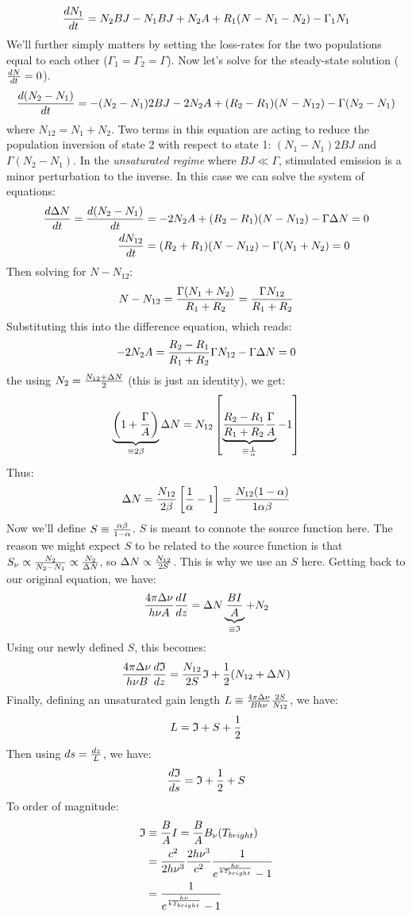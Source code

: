\documentclass[11pt]{article}
\def\hf{{1 \over 2}}
\def\inv#1{{1 \over #1}}
\begin{document}
$${dN_1\over dt}=N_2BJ-N_1BJ+N_2A+R_1(N-N_1-N_2)-\Gamma_1N_1$$
We'll further simply matters by setting the loss-rates for the two populations
equal to each other ($\Gamma_1=\Gamma_2=\Gamma$).  Now let's solve for the 
steady-state solution (${dN\over dt}=0$).
$${d(N_2-N_1)\over dt}=-(N_2-N_1)2BJ-2N_2A+(R_2-R_1)(N-N_{12})-\Gamma(N_2-N_1)$$
where $N_{12}=N_1+N_2$.
Two terms in this equation are acting to reduce the population inversion of
state 2 with respect to state 1: $(N_1-N_1)2BJ$ and $\Gamma(N_2-N_1)$.  In the
{\it unsaturated regime} where $BJ\ll\Gamma$, stimulated emission is a minor
perturbation to the inverse.  In this case we can solve the system of equations:
$$\begin{aligned}{d\Delta N\over dt}={d(N_2-N_1)\over dt}&=-2N_2A+(R_2-R_1)(N-N_{12})
-\Gamma\Delta N=0\\ 
{dN_{12}\over dt}&=(R_2+R_1)(N-N_{12})-\Gamma(N_1+N_2)=0\\ \end{aligned}$$
Then solving for $N-N_{12}$:
$$N-N_{12}={\Gamma(N_1+N_2)\over R_1+R_2}={\Gamma N_{12}\over R_1+R_2}$$
Substituting this into the difference equation, which reads:
$$-2N_2A={R_2-R_1\over R_1+R_2}\Gamma N_{12}-\Gamma\Delta N=0$$
the using $N_2={N_{12}+\Delta N\over2}$ (this is just an identity), we get:
$$\underbrace{\left(1+{\Gamma\over A}\right)}_{\equiv2\beta}\Delta N
=N_{12}\left[\underbrace{{R_2-R_1\over R_1+R_2}{\Gamma\over A}}_{\equiv
\inv{\alpha}}-1\right]$$
Thus:
$$\Delta N={N_{12}\over2\beta}\left[\inv{\alpha}-1\right]={N_{12}(1-\alpha)\over
1\alpha\beta}$$
Now we'll define $S\equiv{\alpha\beta\over1-\alpha}$.  $S$ is meant to connote
the source function here.  The reason we might expect $S$ to be related to
the source function is that $S_\nu\propto{N_2\over N_2-N_1}\propto{N_2\over
\Delta N}$, so $\Delta N\propto {N_{12}\over2S}$.  This is why we use an $S$
here.  Getting back to our original equation, we have:
$${4\pi\Delta\nu\over h\nu A}{dI\over dz}=\Delta N\underbrace{BI\over A}_{
\equiv\mathfrak{I}}+N_2$$
Using our newly defined $S$, this becomes:
$${4\pi\Delta\nu\over h\nu B}{d\mathfrak{I}\over dz}={N_{12}\over2S}\mathfrak{I}+
\hf(N_{12}+\Delta N)$$
Finally, defining an unsaturated gain length $L\equiv{4\pi\Delta\nu\over Bh\nu}
{2S\over N_{12}}$, we have:
$$L=\mathfrak{I}+S+\hf$$
Then using $ds={dz\over L}$, we have:
$${d\mathfrak{I}\over ds}=\mathfrak{I}+\hf+S$$
To order of magnitude:
$$\begin{aligned}\mathfrak{I}&\equiv{B\over A}I={B\over A}B_\nu(T_{bright})\\ 
&={c^2\over2h\nu^3}{2h\nu^3\over c^2}\inv{e^{h\nu\over kT_{bright}}-1}\\ 
&=\inv{e^{h\nu\over kT_{bright}}-1}\\ \end{aligned}$$
\end{document}

